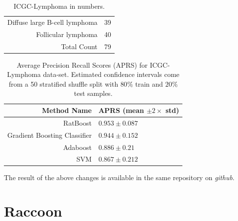 \begin{table}[!ht]
  \centering
  \begin{tabular}{rc}
    Diffuse large B-cell lymphoma & 39 \\
    Follicular lymphoma & 40 \\
    Total Count & 79 \\
  \end{tabular}
  \caption{ICGC-Lymphoma in numbers.}
  \label{tbl:ratboost2-icgc-lymphoma-dataset}
\end{table}

\begin{table}[!ht]
  \centering
  \begin{tabular}{rl}
    Method Name & APRS (mean $\pm 2 \times$ std) \\ \hline
    RatBoost & $0.953 \pm 0.087$ \\
    Gradient Boosting Classifier & $0.944 \pm 0.152$ \\
    Adaboost & $0.886 \pm 0.21$ \\
    SVM & $0.867 \pm 0.212$ \\ \hline
  \end{tabular}
  \caption{Average Precision Recall Scores (APRS) for ICGC-Lymphoma data-set. Estimated confidence intervals come from a 50 stratified shuffle split with $80\%$ train and $20\%$ test samples.}
  \label{tbl:ratboost2-performance}
\end{table}

The result of the above changes is available in the same repository on \emph{github}.

\section{Raccoon}
